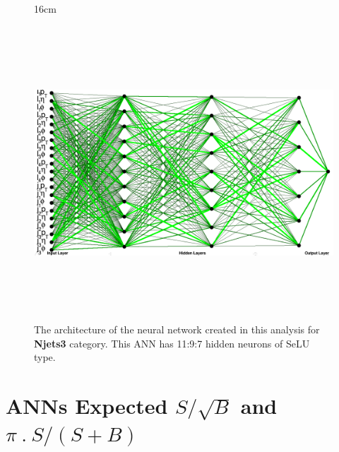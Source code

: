 \begin{figure}[H!]{16cm}
	\caption{The architecture of the neural network created in this analysis for \textbf{Njets3} category. This ANN has 11:9:7 hidden neurons of SeLU type.}
	\includegraphics[width=18cm,height=11cm,angle=90]{ChapterAnalysis/figs/k24nj3_architecture_horizontal}
\end{figure}

\chapter{ANNs Expected $S/\sqrt{B}$ and $\pi~.~S/(S+B)$}
\label{app:significance_cutting_NNs}

